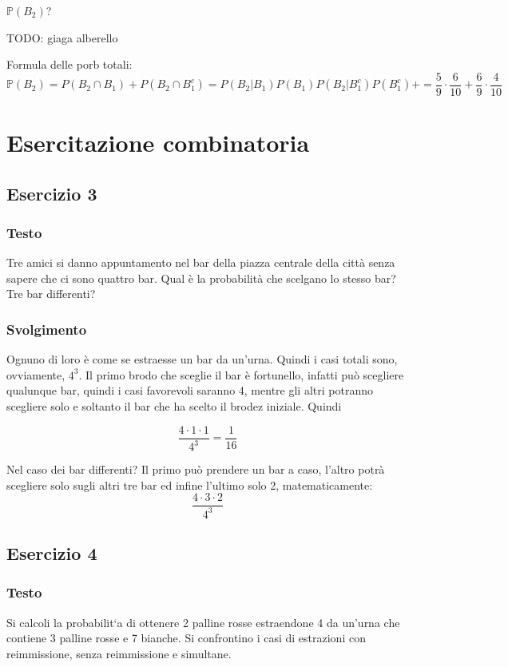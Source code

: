 $\mathbb{P}(B_2)$?

TODO: giaga alberello

Formula delle porb totali:
\[
    \mathbb{P}(B_2) = P(B_2 \cap B_1) + P(B_2\cap B_1^c )= P(B_2| B_1)P (B_1)  P(B_2| B_1^c)P (B_1^c) +  = \frac{5}{9}\cdot \frac{6}{10}+\frac{6}{9}\cdot\frac{4}{10}
\]
\section{Esercitazione combinatoria}
\subsection{Esercizio 3}

\subsubsection{Testo}
Tre amici si danno appuntamento nel bar della piazza centrale della città senza sapere che ci sono quattro bar. Qual è la probabilità che scelgano lo stesso bar? Tre bar differenti?

\subsubsection{Svolgimento}
Ognuno di loro è come se estraesse un bar da un'urna. Quindi i casi totali sono, ovviamente, $4^3$. Il primo brodo che sceglie il bar è fortunello, infatti può scegliere qualunque bar, quindi i casi favorevoli saranno 4, mentre gli altri potranno scegliere solo e soltanto il bar che ha scelto il brodez iniziale. Quindi

\[
  \frac{4\cdot 1\cdot 1}{4^3} = \frac{1}{16}
\]

Nel caso dei bar differenti? Il primo può prendere un bar a caso, l'altro potrà scegliere solo sugli altri tre bar ed infine l'ultimo solo 2, matematicamente:
\[
  \frac{4\cdot 3\cdot 2}{4^3}
\]

\subsection{Esercizio 4}

\subsubsection{Testo}
Si calcoli la probabilit`a di ottenere 2 palline rosse estraendone 4 da un’urna che contiene 3 palline rosse e 7 bianche. Si confrontino i casi di estrazioni con reimmissione, senza reimmissione e simultane.


